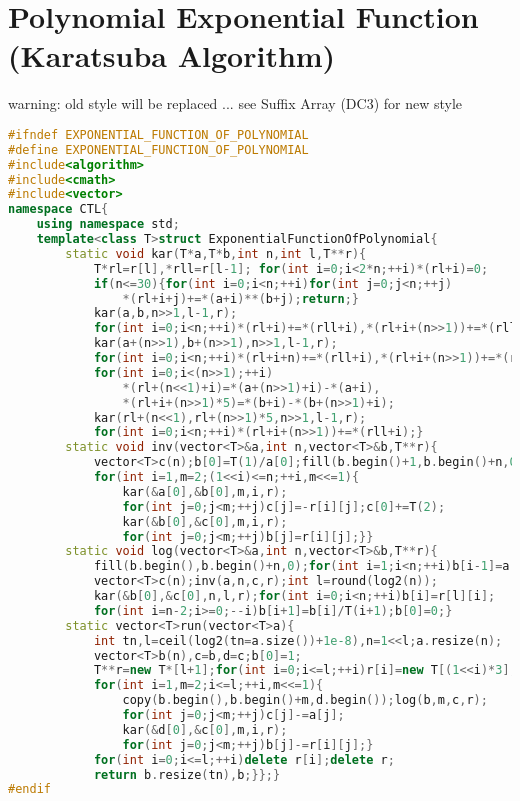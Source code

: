 \documentclass{book}
\begin{document}
\section{Polynomial Exponential Function (Karatsuba Algorithm)}
warning: old style will be replaced ... see Suffix Array (DC3) for new style\begin{lstlisting}[language=C++,title={Polynomial Exponential Function (Karatsuba Algorithm).hpp (2297 bytes, 45 lines)}]
#ifndef EXPONENTIAL_FUNCTION_OF_POLYNOMIAL
#define EXPONENTIAL_FUNCTION_OF_POLYNOMIAL
#include<algorithm>
#include<cmath>
#include<vector>
namespace CTL{
    using namespace std;
    template<class T>struct ExponentialFunctionOfPolynomial{
        static void kar(T*a,T*b,int n,int l,T**r){
            T*rl=r[l],*rll=r[l-1]; for(int i=0;i<2*n;++i)*(rl+i)=0;
            if(n<=30){for(int i=0;i<n;++i)for(int j=0;j<n;++j)
                *(rl+i+j)+=*(a+i)**(b+j);return;}
            kar(a,b,n>>1,l-1,r);
            for(int i=0;i<n;++i)*(rl+i)+=*(rll+i),*(rl+i+(n>>1))+=*(rll+i);
            kar(a+(n>>1),b+(n>>1),n>>1,l-1,r);
            for(int i=0;i<n;++i)*(rl+i+n)+=*(rll+i),*(rl+i+(n>>1))+=*(rll+i);
            for(int i=0;i<(n>>1);++i)
                *(rl+(n<<1)+i)=*(a+(n>>1)+i)-*(a+i),
                *(rl+i+(n>>1)*5)=*(b+i)-*(b+(n>>1)+i);
            kar(rl+(n<<1),rl+(n>>1)*5,n>>1,l-1,r);
            for(int i=0;i<n;++i)*(rl+i+(n>>1))+=*(rll+i);}
        static void inv(vector<T>&a,int n,vector<T>&b,T**r){
            vector<T>c(n);b[0]=T(1)/a[0];fill(b.begin()+1,b.begin()+n,0);
            for(int i=1,m=2;(1<<i)<=n;++i,m<<=1){
                kar(&a[0],&b[0],m,i,r);
                for(int j=0;j<m;++j)c[j]=-r[i][j];c[0]+=T(2);
                kar(&b[0],&c[0],m,i,r);
                for(int j=0;j<m;++j)b[j]=r[i][j];}}
        static void log(vector<T>&a,int n,vector<T>&b,T**r){
            fill(b.begin(),b.begin()+n,0);for(int i=1;i<n;++i)b[i-1]=a[i]*T(i);
            vector<T>c(n);inv(a,n,c,r);int l=round(log2(n));
            kar(&b[0],&c[0],n,l,r);for(int i=0;i<n;++i)b[i]=r[l][i];
            for(int i=n-2;i>=0;--i)b[i+1]=b[i]/T(i+1);b[0]=0;}
        static vector<T>run(vector<T>a){
            int tn,l=ceil(log2(tn=a.size())+1e-8),n=1<<l;a.resize(n);
            vector<T>b(n),c=b,d=c;b[0]=1;
            T**r=new T*[l+1];for(int i=0;i<=l;++i)r[i]=new T[(1<<i)*3];
            for(int i=1,m=2;i<=l;++i,m<<=1){
                copy(b.begin(),b.begin()+m,d.begin());log(b,m,c,r);
                for(int j=0;j<m;++j)c[j]-=a[j];
                kar(&d[0],&c[0],m,i,r);
                for(int j=0;j<m;++j)b[j]-=r[i][j];}
            for(int i=0;i<=l;++i)delete r[i];delete r;
            return b.resize(tn),b;}};}
#endif\end{lstlisting}
\end{document}
